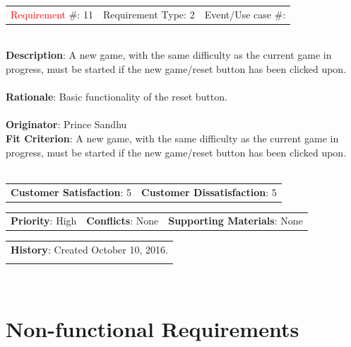 \documentclass[12pt, titlepage]{article}
\begin{document}
\begin{reqbox}

\begin{tabular}{lll}
\textcolor{red}{Requirement} \#: 11 & Requirement Type: 2 & Event/Use case \#: \\ %
\end{tabular} \\

\textbf{Description}: A new game, with the same difficulty as the current game in progress, must be started if
the new game/reset button has been clicked upon.\\ \\
\textbf{Rationale}: Basic functionality of the reset button. \\ \\
\textbf{Originator}: Prince Sandhu \\
\textbf{Fit Criterion}: A new game, with the same difficulty as the current game in progress, must be started if
the new game/reset button has been clicked upon.\\ \\

\begin{tabular}{ll}
\textbf{Customer Satisfaction}: 5 & \textbf{Customer Dissatisfaction}: 5 \\
\end{tabular}

\begin{tabular}{lll}
\textbf{Priority}: High & \textbf{Conflicts}: None & \textbf{Supporting Materials}: None \\
\end{tabular}

\begin{tabular}{l}
\textbf{History}: Created October 10, 2016.\\ \\
\end{tabular} \\

\end{reqbox}
\newpage
\section{Non-functional Requirements}
\end{document}
